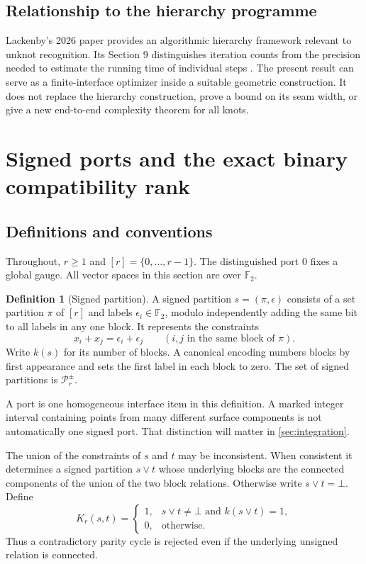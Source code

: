 \documentclass[11pt,letterpaper]{article}
\theoremstyle{definition}
\newtheorem{definition}[theorem]{Definition}
\newcommand{\F}{\mathbb F}
\newcommand{\SP}{\mathcal P_r^{\pm}}
\newcommand{\bad}{\bot}
\begin{document}
\subsection{Relationship to the hierarchy programme}
Lackenby's 2026 paper provides an algorithmic hierarchy framework relevant to unknot recognition. Its Section 9 distinguishes iteration counts from the precision needed to estimate the running time of individual steps \cite{lackenby}. The present result can serve as a finite-interface optimizer inside a suitable geometric construction. It does not replace the hierarchy construction, prove a bound on its seam width, or give a new end-to-end complexity theorem for all knots.

\section{Signed ports and the exact binary compatibility rank}
\label{sec:signed}

\subsection{Definitions and conventions}
Throughout, $r\ge1$ and $[r]=\{0,\ldots,r-1\}$. The distinguished port $0$ fixes a global gauge. All vector spaces in this section are over $\F_2$.

\begin{definition}[Signed partition]
A signed partition $s=(\pi,\epsilon)$ consists of a set partition $\pi$ of $[r]$ and labels $\epsilon_i\in\F_2$, modulo independently adding the same bit to all labels in any one block. It represents the constraints
\begin{equation}\label{eq:constraints}
 x_i+x_j=\epsilon_i+\epsilon_j\qquad(i,j\text{ in the same block of }\pi).
\end{equation}
Write $k(s)$ for its number of blocks. A canonical encoding numbers blocks by first appearance and sets the first label in each block to zero. The set of signed partitions is $\SP$.
\end{definition}
A port is one homogeneous interface item in this definition. A marked integer interval containing points from many different surface components is not automatically one signed port. That distinction will matter in \cref{sec:integration}.

The union of the constraints of $s$ and $t$ may be inconsistent. When consistent it determines a signed partition $s\vee t$ whose underlying blocks are the connected components of the union of the two block relations. Otherwise write $s\vee t=\bad$. Define
\begin{equation}\label{eq:kernel}
 K_r(s,t)=
 \begin{cases}
 1,&s\vee t\ne\bad\text{ and }k(s\vee t)=1,\\
 0,&\text{otherwise}.
 \end{cases}
\end{equation}
Thus a contradictory parity cycle is rejected even if the underlying unsigned relation is connected.
\end{document}
